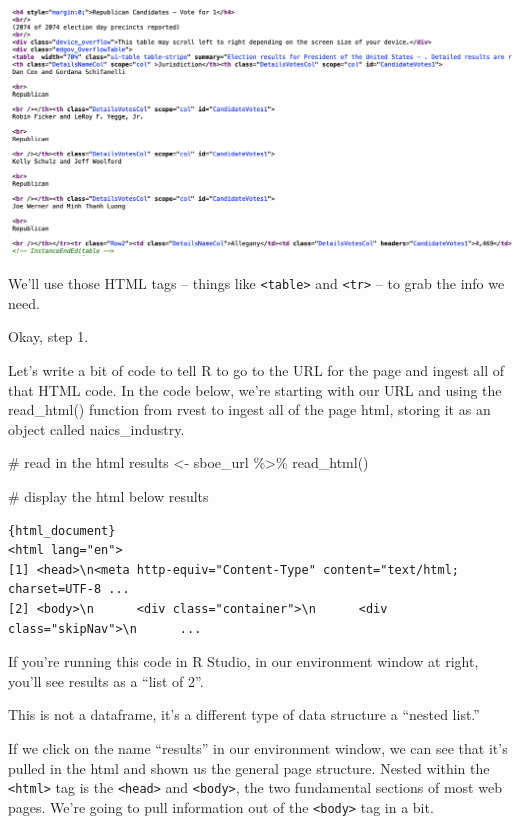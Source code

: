 \documentclass[
  letterpaper,
  DIV=11,
  numbers=noendperiod]{scrreprt}
\newenvironment{Shaded}{\begin{snugshade}}{\end{snugshade}}
\newcommand{\CommentTok}[1]{\textcolor[rgb]{0.37,0.37,0.37}{#1}}
\newcommand{\FunctionTok}[1]{\textcolor[rgb]{0.28,0.35,0.67}{#1}}
\newcommand{\NormalTok}[1]{\textcolor[rgb]{0.00,0.23,0.31}{#1}}
\newcommand{\OtherTok}[1]{\textcolor[rgb]{0.00,0.23,0.31}{#1}}
\newcommand{\SpecialCharTok}[1]{\textcolor[rgb]{0.37,0.37,0.37}{#1}}
\begin{document}
\includegraphics[width=7.22in,height=\textheight]{./images/rvest2.png}

We'll use those HTML tags -- things like
\texttt{\textless{}table\textgreater{}} and
\texttt{\textless{}tr\textgreater{}} -- to grab the info we need.

Okay, step 1.

Let's write a bit of code to tell R to go to the URL for the page and
ingest all of that HTML code. In the code below, we're starting with our
URL and using the read\_html() function from rvest to ingest all of the
page html, storing it as an object called naics\_industry.

\begin{Shaded}
\begin{Highlighting}[]
\CommentTok{\# read in the html }
\NormalTok{results }\OtherTok{\textless{}{-}}\NormalTok{ sboe\_url }\SpecialCharTok{\%\textgreater{}\%}
  \FunctionTok{read\_html}\NormalTok{() }

\CommentTok{\# display the html below}
\NormalTok{results}
\end{Highlighting}
\end{Shaded}

\begin{verbatim}
{html_document}
<html lang="en">
[1] <head>\n<meta http-equiv="Content-Type" content="text/html; charset=UTF-8 ...
[2] <body>\n      <div class="container">\n      <div class="skipNav">\n      ...
\end{verbatim}

If you're running this code in R Studio, in our environment window at
right, you'll see results as a ``list of 2''.

This is not a dataframe, it's a different type of data structure a
``nested list.''

If we click on the name ``results'' in our environment window, we can
see that it's pulled in the html and shown us the general page
structure. Nested within the \texttt{\textless{}html\textgreater{}} tag
is the \texttt{\textless{}head\textgreater{}} and
\texttt{\textless{}body\textgreater{}}, the two fundamental sections of
most web pages. We're going to pull information out of the
\texttt{\textless{}body\textgreater{}} tag in a bit.
\end{document}
